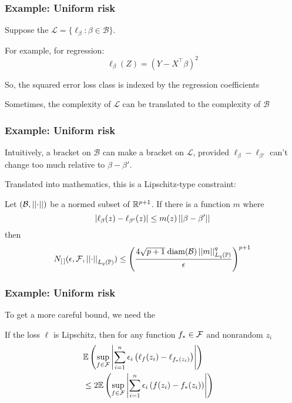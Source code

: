 \documentclass[12pt]{beamer}
\begin{document}
\begin{frame}[fragile]
\frametitle{Example: Uniform risk }

\vsp
Suppose the $\mathcal{L} = \{ \ell_\beta: \beta \in \mathcal{B}\}$. 
\vsp

For example, for regression:
\[
\ell_\beta(Z) = (Y - X^{\top}\beta)^2
\]

\vsp
So, the squared error loss class is indexed by the regression coefficients

\vsp
Sometimes, the complexity of $\mathcal{L}$ can be translated to the complexity of $\mathcal{B}$

\end{frame}

\begin{frame}[fragile]
\frametitle{Example: Uniform risk }
Intuitively, a bracket on $\mathcal{B}$ can make a bracket on $\mathcal{L}$, provided $\ell_\beta - \ell_{\beta'}$
can't change too much relative to $\beta - \beta'$.  

\vsp
Translated into mathematics, this is a Lipschitz-type constraint:  

\vsp
Let $(\mathcal{B},\left|\left| \cdot \right|\right|)$ be a normed subset of
$\mathbb{R}^{p+1}$.  If there is a function $m$ where
\[
|\ell_{\beta}(z) - \ell_{\beta'}(z)| \leq m(z)\left|\left| \beta - \beta' \right|\right|
\]
then
\[
N_{[\,]}(\epsilon, \mathcal{F}, \left|\left| \cdot \right|\right|_{L_q(\mathbb{P})}) \leq \left( \frac{4\sqrt{p+1} \; \textrm{diam}(\mathcal{B}) \left|\left| m \right|\right|_{L_q(\mathbb{P})}^q}{\epsilon} \right)^{p+1}
\]
\end{frame}

\begin{frame}[fragile]
\frametitle{Example: Uniform risk }
To get a more careful bound, we need the 


\vsp
If the loss $\ell$ is Lipschitz, then for any function $f_* \in \mathcal{F}$ and nonrandom $z_i$
\begin{align*}
\lefteqn{\E\left( \sup_{f \in \F} \left| \sum_{i=1}^n \epsilon_i\left( \ell_f(z_i) - \ell_{f_*(z_i)} \right) \right| \right) }\\
& \leq
2\E\left( \sup_{f \in \F} \left| \sum_{i=1}^n \epsilon_i\left( f(z_i) -f_*(z_i) \right) \right| \right) 
\end{align*}
\end{frame}
\end{document}
